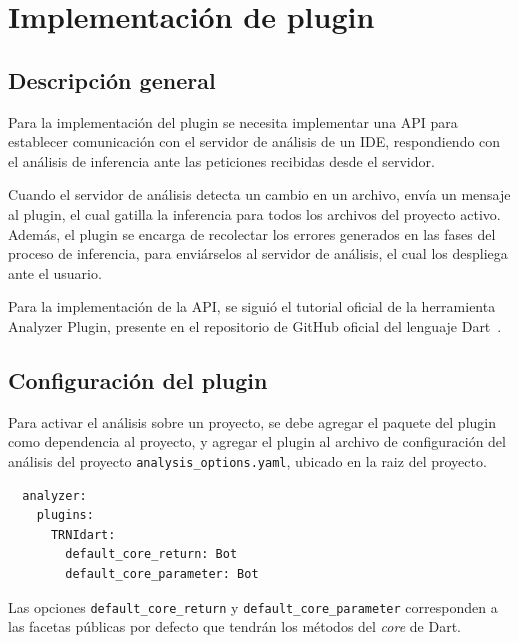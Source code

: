 \section{Implementación de plugin}

\subsection{Descripción general}
Para la implementación del plugin se necesita implementar una API para establecer comunicación con el servidor de análisis de un IDE, respondiendo con el análisis de inferencia ante las peticiones recibidas desde el servidor.

Cuando el servidor de análisis detecta un cambio en un archivo, envía un mensaje al plugin, el cual gatilla la inferencia para todos los archivos del proyecto activo. Además, el plugin se encarga de recolectar los errores generados en las fases del proceso de inferencia, para enviárselos al servidor de análisis, el cual los despliega ante el usuario.

Para la implementación de la API, se siguió el tutorial oficial de la herramienta Analyzer Plugin, presente en el repositorio de GitHub oficial del lenguaje Dart~\cite{plugin}.

\subsection{Configuración del plugin}
Para activar el análisis sobre un proyecto, se debe agregar el paquete del plugin como dependencia al proyecto, y agregar el plugin al archivo de configuración del análisis del proyecto \texttt{analysis\_options.yaml}, ubicado en la raiz del proyecto.

\begin{verbatim}
  analyzer:
    plugins:
      TRNIdart:
        default_core_return: Bot
        default_core_parameter: Bot
\end{verbatim}

Las opciones \texttt{default\_core\_return} y \texttt{default\_core\_parameter} corresponden a las facetas públicas por defecto que tendrán los métodos del \textit{core} de Dart.
